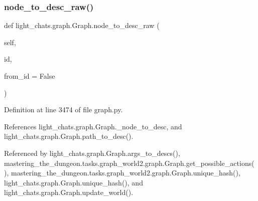 \subsubsection{\texorpdfstring{node\+\_\+to\+\_\+desc\+\_\+raw()}{node\_to\_desc\_raw()}}
{\footnotesize\ttfamily def light\+\_\+chats.\+graph.\+Graph.\+node\+\_\+to\+\_\+desc\+\_\+raw (\begin{DoxyParamCaption}\item[{}]{self,  }\item[{}]{id,  }\item[{}]{from\+\_\+id = {\ttfamily False} }\end{DoxyParamCaption})}



Definition at line 3474 of file graph.\+py.



References light\+\_\+chats.\+graph.\+Graph.\+\_\+node\+\_\+to\+\_\+desc, and light\+\_\+chats.\+graph.\+Graph.\+path\+\_\+to\+\_\+desc().



Referenced by light\+\_\+chats.\+graph.\+Graph.\+args\+\_\+to\+\_\+descs(), mastering\+\_\+the\+\_\+dungeon.\+tasks.\+graph\+\_\+world2.\+graph.\+Graph.\+get\+\_\+possible\+\_\+actions(), mastering\+\_\+the\+\_\+dungeon.\+tasks.\+graph\+\_\+world2.\+graph.\+Graph.\+unique\+\_\+hash(), light\+\_\+chats.\+graph.\+Graph.\+unique\+\_\+hash(), and light\+\_\+chats.\+graph.\+Graph.\+update\+\_\+world().

